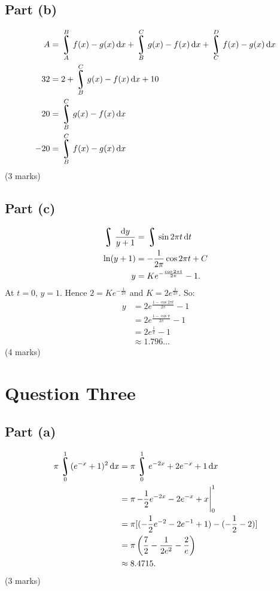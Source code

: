 \documentclass[a4paper]{report}
\DeclareMathOperator*{\rint}{\scalerel*{\rotatebox{17}{$\!\int\!$}}{\int}}
\begin{document}
\subsection*{Part (b)}
\begin{align*}
  A &= \rint_A^B f(x) - g(x) \dif{x} + \rint_B^C g(x) - f(x) \dif{x} + \rint_C^D f(x) - g(x) \dif{x}\\
  32 &= 2 + \rint_B^C g(x) - f(x) \dif{x} + 10\\
  20 &= \rint_B^C g(x) - f(x) \dif{x}\\
  -20 &= \rint_B^C f(x) - g(x) \dif{x}
\end{align*}
(3 marks)

\subsection*{Part (c)}
\begin{align*}
  \rint \frac{\dif{y}}{y + 1} &= \rint \sin 2\pi t \dif{t}\\
  \ln(y + 1) &= -\frac{1}{2\pi} \cos 2\pi t + C\\
  y &= Ke^{-\frac{\cos 2\pi t}{2\pi}} - 1.
\end{align*}
At $ t = 0 $, $ y = 1 $. Hence $ 2 = Ke^{-\frac{1}{2\pi}} $ and $ K = 2e^{\frac{1}{2\pi}} $. So:
\begin{align*}
  y &= 2e^{\frac{1 - \cos 2\pi t}{2\pi}} - 1\\
    &= 2e^{\frac{1 - \cos \pi}{2\pi}} - 1\\
    &= 2e^{\frac{1}{\pi}} - 1\\
    &\approx 1.796...
\end{align*}
(4 marks)

\section*{Question Three}
\subsection*{Part (a)}
\begin{align*}
  \pi \rint^1_0 (e^{-x} + 1)^2 \dif{x} &= \pi \rint^1_0 e^{-2x} + 2e^{-x} + 1 \dif{x}\\
                                       &= \pi \eval{-\frac{1}{2} e^{-2x} - 2e^{-x} + x}_0^1\\
                                       &= \pi [(-\frac{1}{2} e^{-2} - 2e^{-1} + 1) - (-\frac{1}{2} - 2)]\\
                                       &= \pi\left( \frac{7}{2} - \frac{1}{2e^2} - \frac{2}{e} \right)\\
                                       &\approx 8.4715.
\end{align*}
(3 marks)
\end{document}
